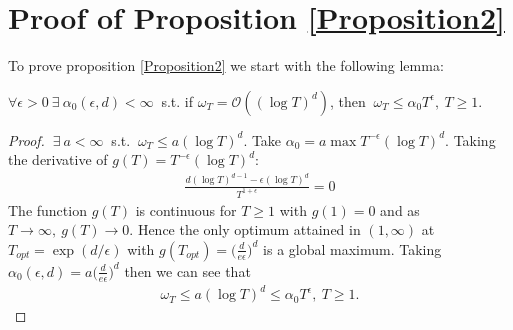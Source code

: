 \appendix

\section{Proof of Proposition \ref{Proposition2}}

To prove proposition \ref{Proposition2} we start with the following lemma:
\begin{lem}
$\forall \epsilon > 0 \ \exists \ \alpha_0(\epsilon, d) < \infty \ $ s.t. if $\omega_T = \mathcal{O}((\log T)^{d})$, then $\ \omega_{T} \leq \alpha_0 T^{\epsilon}, \ T \geq 1$.  \label{gamma-bound} 
\end{lem}
\begin{proof}
$\ \exists \ a < \infty \ $ s.t. $\ \omega_{T} \leq a (\log T)^{d}$. Take $\alpha_0 = a \max T^{-\epsilon} (\log T)^{d}$. Taking the derivative of $g(T) = T^{-\epsilon} (\log T)^{d}$:
\begin{align}
\frac{d(\log T)^{d-1} - \epsilon(\log T)^{d}}{T^{1+\epsilon}} = 0
\end{align}
The function $g(T)$ is continuous for $T \geq 1$ with $g(1) = 0$ and as $T \to \infty, \ g(T) \to 0$. Hence the only optimum attained in $(1, \infty)$ at $T_{opt} = \exp(d/\epsilon)$ with $g(T_{opt}) = \big(\frac{d}{e\epsilon}\big)^{d}$ is a global maximum. Taking $\alpha_0(\epsilon,d) = a\big(\frac{d}{e\epsilon}\big)^{d}$ then we can see that 
\begin{align}
\omega_{T} \leq a (\log T)^{d} \leq \alpha_0 T^{\epsilon}, \ T \geq 1. 
\end{align}
\end{proof}

